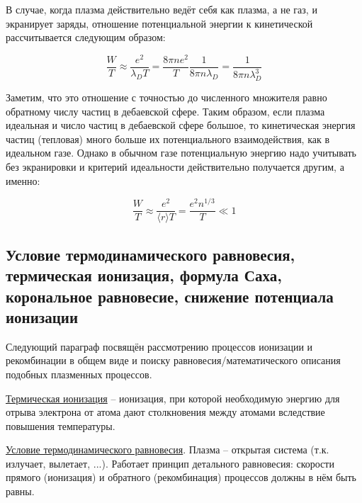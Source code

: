 \documentclass[10pt, a4paper]{article}
\begin{document}
В случае, когда плазма действительно ведёт себя как плазма, а не газ, и экранирует заряды, отношение потенциальной энергии к кинетической рассчитывается следующим образом:

\begin{equation}
	\frac{W}{T} \approx \frac{e^2}{\lambda_D T} = \frac{8\pi n e^2}{T}\frac{1}{8\pi n\lambda_D} = \frac{1}{8\pi n \lambda_D^3}
\end{equation}

Заметим, что это отношение с точностью до численного множителя равно обратному числу частиц в дебаевской сфере. Таким образом, если плазма идеальная и число частиц в дебаевской сфере большое, то кинетическая энергия частиц (тепловая) много больше их потенциального взаимодействия, как в идеальном газе. Однако в обычном газе потенциальную энергию надо учитывать без экранировки и критерий идеальности действительно получается другим, а именно:

\begin{equation}
	\frac{W}{T} \approx \frac{e^2}{\langle r \rangle T} = \frac{e^2 n^{1/3}}{T} \ll 1
\end{equation}

\subsection{Условие термодинамического равновесия, термическая ионизация, формула Саха, корональное равновесие, снижение потенциала ионизации} \label{subsec:thermo_equilibrium}

Следующий параграф посвящён рассмотрению процессов ионизации и рекомбинации в общем виде и поиску равновесия/математического описания подобных плазменных процессов.

\uline{Термическая ионизация} -- ионизация, при которой необходимую энергию для отрыва электрона от атома дают столкновения между атомами вследствие повышения температуры.

\uline{Условие термодинамического равновесия}. Плазма -- открытая система (т.к. излучает, вылетает, ...). Работает принцип детального равновесия: скорости прямого (ионизация) и обратного (рекомбинация) процессов должны в нём быть равны.
\end{document}
